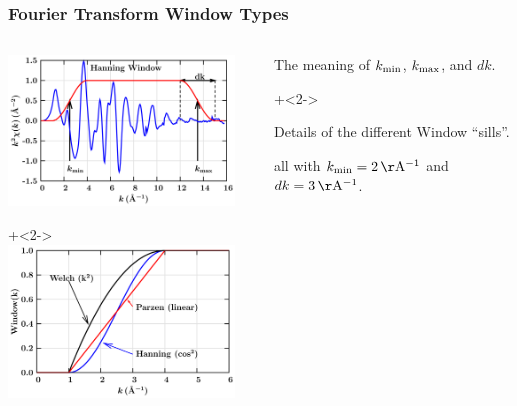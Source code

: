 \begin{frame} \frametitle{Fourier Transform Window Types}
\begin{cenpage}{130mm}

  \begin{columns}
    
    \begin{column}{70mm}
      \includegraphics[width=60mm]{figs/reduction/ftwin_anat}

      \vmm
      {\onslide+<2-> {
          \includegraphics[width=60mm]{figs/reduction/ftwin_sills}
        }}
      
    \end{column}

    \begin{column}{55mm}

        \vspace{0.5mm}

      The meaning of $k_{\rm min}$, $k_{\rm max}$, and $dk$.

      \vspace{10mm}

      
      {\onslide+<2-> {
          
      
      \vspace{0.5mm}

      Details of the different Window ``sills''.

      all with $k_{\rm  min}=2\rm\,\AA^{-1}$  and $dk=3\rm\,\AA^{-1} $.

      \vspace{3mm}
    }}
    \end{column}
  \end{columns}

\end{cenpage}
\end{frame}

